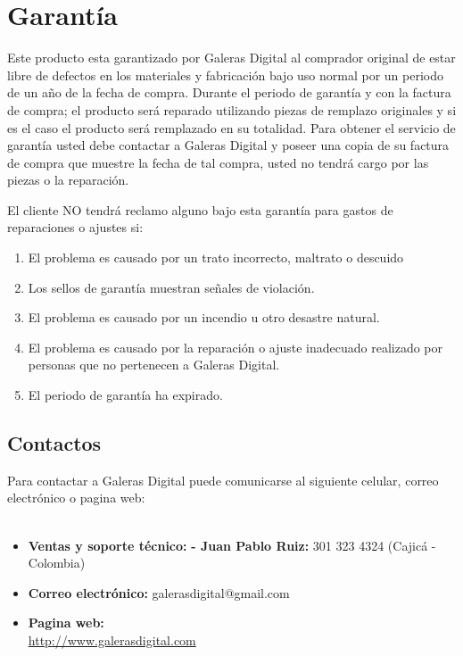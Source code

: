 \documentclass[10pt,notitlepage,openany]{scrbook}
\begin{document}
\chapter{Garantía}

Este producto esta garantizado por Galeras Digital al comprador original de estar libre de defectos en los materiales y fabricación bajo uso normal por un periodo de un año de la fecha de compra. Durante el periodo de garantía y con la factura de compra; el producto será reparado utilizando piezas de remplazo originales y si es el caso el producto será remplazado en su totalidad. Para obtener el servicio de garantía usted debe contactar a Galeras Digital y poseer una copia de su factura de compra que muestre la fecha de tal compra, usted no tendrá cargo por las piezas o la reparación.

El cliente NO tendrá reclamo alguno bajo esta garantía para gastos de reparaciones o ajustes si:

\begin{enumerate}
\item El problema es causado por un trato incorrecto, maltrato o descuido
\item Los sellos de garantía muestran señales de violación.
\item El problema es causado por un incendio u otro desastre natural.
\item El problema es causado por la reparación o ajuste inadecuado realizado por personas que no pertenecen a Galeras Digital.
\item El periodo de garantía ha expirado.
\end{enumerate}

\newpage

\section{Contactos}

Para contactar a Galeras Digital puede comunicarse al siguiente celular, correo electrónico o pagina web:
\
\\
\\
\begin{itemize}
\item\textbf{Ventas y soporte técnico:}
\subitem\textbf{- Juan Pablo Ruiz:} 301 323 4324
\subitem \hspace{0.5cm}(Cajicá - Colombia)
\item\textbf{Correo electrónico:} galerasdigital@gmail.com
\item\textbf{Pagina web:}\\ \url{http://www.galerasdigital.com}
\end{itemize}
\end{document}
